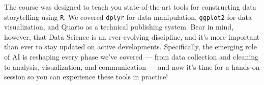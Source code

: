\documentclass[
  letterpaper,
  DIV=11,
  numbers=noendperiod]{scrartcl}
\begin{document}
The course was designed to teach you state-of-the-art tools for
constructing data storytelling using \texttt{R}. We covered
\texttt{dplyr} for data manipulation, \texttt{ggplot2} for data
visualization, and Quarto as a technical publishing system. Bear in
mind, however, that Data Science is an ever-evolving discipline, and
it's more important than ever to stay updated on active developments.
Specifically, the emerging role of AI is reshaping every phase we've
covered --- from data collection and cleaning to analysis,
visualization, and communication --- and now it's time for a hands-on
session so you can experience these tools in practice!
\end{document}
